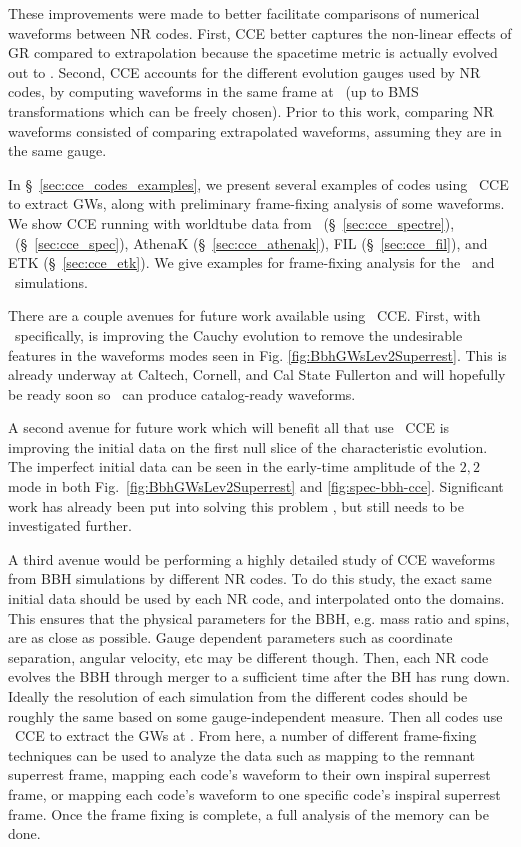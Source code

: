\begin{bibunit}[unsrtnat]
These improvements were made to better facilitate comparisons of numerical
waveforms between NR codes. First, CCE better captures the non-linear effects of
GR compared to extrapolation because the spacetime metric is actually evolved
out to \scri. Second, CCE accounts for the different evolution gauges used by NR
codes, by computing waveforms in the same frame at \scri~(up to BMS
transformations which can be freely chosen). Prior to this work, comparing NR
waveforms consisted of comparing extrapolated waveforms, assuming they are in
the same gauge.

In \S~\ref{sec:cce_codes_examples}, we present several examples of codes using
\spectre~CCE to extract GWs, along with preliminary frame-fixing analysis of
some waveforms. We show CCE running with worldtube data from
\spectre~(\S~\ref{sec:cce_spectre}), \spec~(\S~\ref{sec:cce_spec}), AthenaK
(\S~\ref{sec:cce_athenak}), FIL (\S~\ref{sec:cce_fil}), and ETK
(\S~\ref{sec:cce_etk}). We give examples for frame-fixing analysis for the
\spectre~and \spec~simulations.

There are a couple avenues for future work available using \spectre~CCE. First,
with \spectre~specifically, is improving the Cauchy evolution to remove the
undesirable features in the waveforms modes seen in Fig.
\ref{fig:BbhGWsLev2Superrest}. This is already underway at Caltech, Cornell, and
Cal State Fullerton and will hopefully be ready soon so \spectre~can produce
catalog-ready waveforms.

A second avenue for future work which will benefit all that use \spectre~CCE is
improving the initial data on the first null slice of the characteristic
evolution. The imperfect initial data can be seen in the early-time amplitude of
the $2,2$ mode in both Fig.~\ref{fig:BbhGWsLev2Superrest} and
\ref{fig:spec-bbh-cce}. Significant work has already been put into solving this
problem \cite{DaRe:2026}, but still needs to be investigated further.

A third avenue would be performing a highly detailed study of CCE waveforms from
BBH simulations by different NR codes. To do this study, the exact same initial
data should be used by each NR code, and interpolated onto the domains. This
ensures that the physical parameters for the BBH, e.g. mass ratio and spins, are
as close as possible. Gauge dependent parameters such as coordinate separation,
angular velocity, etc may be different though. Then, each NR code evolves the
BBH through merger to a sufficient time after the BH has rung down. Ideally the
resolution of each simulation from the different codes should be roughly the
same based on some gauge-independent measure. Then all codes use \spectre~CCE to
extract the GWs at \scri. From here, a number of different frame-fixing
techniques can be used to analyze the data such as mapping to the remnant
superrest frame, mapping each code's waveform to their own inspiral superrest
frame, or mapping each code's waveform to one specific code's inspiral superrest
frame. Once the frame fixing is complete, a full analysis of the memory can be
done.


\end{bibunit}
